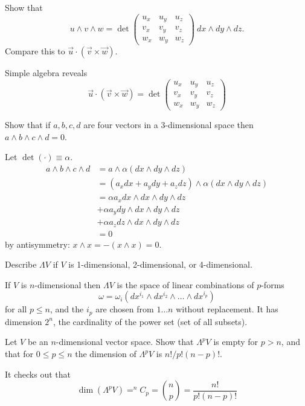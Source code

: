 \documentclass[10pt]{article}
\begin{document}
\begin{example}
	Show that
	$$
		u \wedge v \wedge w = \det \begin{pmatrix}
			u_x&u_y&u_z\\v_x&v_y&v_z\\w_x&w_y&w_z
		\end{pmatrix}\:dx \wedge dy\wedge dz.
	$$
	Compare this to $\vec{u} \cdot (\vec{v} \times \vec{w})$.
\end{example}
\sol Simple algebra reveals 
$$\vec{u} \cdot (\vec{v} \times \vec{w}) = \det \begin{pmatrix}
	u_x&u_y&u_z\\v_x&v_y&v_z\\w_x&w_y&w_z
\end{pmatrix}$$


\begin{example}
	Show that if $a,b,c,d$ are four vectors in a 3-dimensional space then $a\wedge b\wedge c\wedge d = 0$.
\end{example}
\sol Let $\det(\cdot) \equiv \alpha$.
$$
\begin{aligned}
	a\wedge b\wedge c\wedge d &= a \wedge \alpha (dx \wedge dy\wedge dz)\\
	&= (a_xdx + a_ydy + a_zdz) \wedge \alpha (dx \wedge dy\wedge dz)\\
	&= \alpha a_xdx \wedge dx \wedge dy\wedge dz\\
	&+ \alpha a_ydy \wedge dx \wedge dy\wedge dz\\
	&+ \alpha a_zdz \wedge dx \wedge dy\wedge dz\\
	&= 0
\end{aligned}
$$
by antisymmetry: $x \wedge x = -(x \wedge x) = 0$.


\begin{example}
	Describe $\Lambda V$ if $V$ is 1-dimensional, 2-dimensional, or 4-dimensional.
\end{example}
\sol If $V$ is $n$-dimensional then $\Lambda V$ is the space of linear combinations of $p$-forms 
$$\omega = \omega_i (dx^{i_1} \wedge dx^{i_2} \wedge \dots \wedge dx^{i_p})$$
for all $p \le n$, and the $i_p$ are chosen from $1 \dots n$ without replacement. It has dimension $2^n$, the cardinality of the power set (set of all subsets).


\begin{example}
	Let $V$ be an $n$-dimensional vector space. Show that $\Lambda^p V$ is empty for $p > n$, and that for $0 \le p \le n$ the dimension of $\Lambda^p V$ is $n!/p!(n-p)!$.
\end{example}
\sol It checks out that
$$
\dim(\Lambda^p V) = ^n\!\!C_p = {n \choose p} = \frac{n!}{p!(n-p)!}
$$
\end{document}
